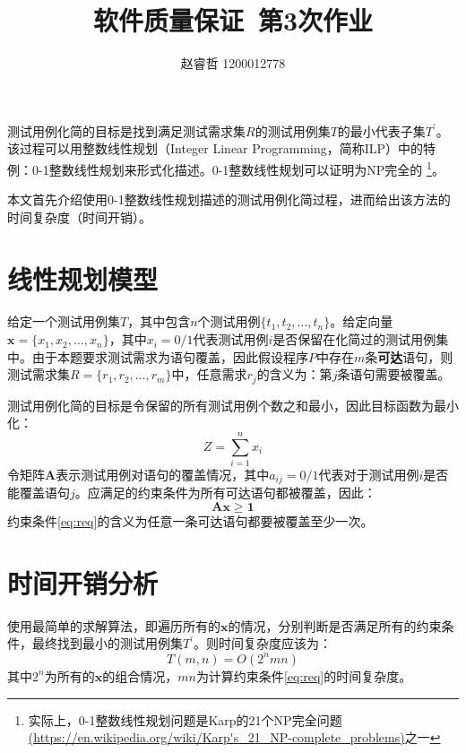 \documentclass[a4paper,12pt]{article}
\begin{document}
\title{软件质量保证\ 第3次作业}
\author{赵睿哲 1200012778}
\maketitle

测试用例化简的目标是找到满足测试需求集$R$的测试用例集$T$的最小代表子集$T^{'}$。该过程可以用整数线性规划（Integer Linear Programming，简称ILP）中的特例：0-1整数线性规划来形式化描述。0-1整数线性规划可以证明为NP完全的
\footnote{实际上，0-1整数线性规划问题是Karp的21个NP完全问题\url{(https://en.wikipedia.org/wiki/Karp's_21_NP-complete_problems)}之一}。

本文首先介绍使用0-1整数线性规划描述的测试用例化简过程，进而给出该方法的时间复杂度（时间开销）。

\section{线性规划模型}

给定一个测试用例集$T$，其中包含$n$个测试用例$\{ t_1, t_2, \dots, t_n \}$。给定向量$\mathbf{x} = \{ x_1, x_2, \dots, x_n \}$，其中$x_i = 0/1$代表测试用例$i$是否保留在化简过的测试用例集中。由于本题要求测试需求为语句覆盖，因此假设程序$P$中存在$m$条\textbf{可达}语句，则测试需求集$R = \{r_1,r_2,\dots,r_m\}$中，任意需求$r_j$的含义为：第$j$条语句需要被覆盖。

测试用例化简的目标是令保留的所有测试用例个数之和最小，因此目标函数为最小化：
\begin{equation}\label{eq:objec}
Z = \sum_{i=1}^{n} x_i
\end{equation}
令矩阵$\mathbf{A}$表示测试用例对语句的覆盖情况，其中$a_{ij} = 0/1$代表对于测试用例$i$是否能覆盖语句$j$。应满足的约束条件为所有可达语句都被覆盖，因此：
\begin{equation}\label{eq:req}
\mathbf{A}\mathbf{x} \geq \mathbf{1}
\end{equation}
约束条件\ref{eq:req}的含义为任意一条可达语句都要被覆盖至少一次。

\section{时间开销分析}

使用最简单的求解算法，即遍历所有的$\mathbf{x}$的情况，分别判断是否满足所有的约束条件，最终找到最小的测试用例集$T^{'}$。则时间复杂度应该为：
\begin{equation}
T(m, n) = O(2^nmn)
\end{equation}
其中$2^n$为所有的$\mathbf{x}$的组合情况，$mn$为计算约束条件\ref{eq:req}的时间复杂度。
\end{document}
